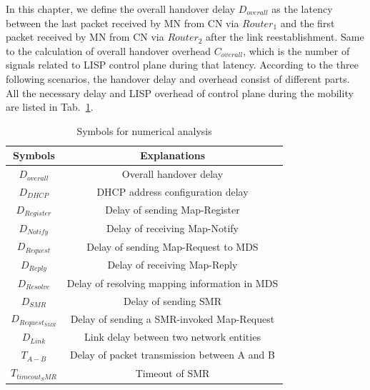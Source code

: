 In this chapter, we define the overall handover delay $D_{overall}$ as the latency between the last packet received by MN from CN via $Router_1$ and the first packet received by MN from CN via $Router_2$ after the link reestablishment. 
Same to the calculation of overall handover overhead $C_{overall}$, which is the number of signals related to LISP control plane during that latency. 
According to the three following scenarios, the handover delay and overhead consist of different parts. All the necessary delay and LISP overhead of control plane during the mobility are listed in Tab.~\ref{Symbols_numerical_analysis}.
\begin{table}[!tb]
	\centering
	\caption{Symbols for numerical analysis}
	\label{Symbols_numerical_analysis}{
		\begin{tabular}{@{}|c|c|@{}}
			\hline\hline
			Symbols & Explanations   \\ \hline
			$D_{overall}$ & Overall handover delay	\\  \hline    
			$D_{DHCP}$ &  DHCP address configuration delay \\  \hline    
			$D_{Register}$ &  Delay of sending Map-Register      	\\  \hline
			$D_{Notify}$ &  Delay of receiving Map-Notify      	\\  \hline           
			$D_{Request}$ &  Delay of sending Map-Request to MDS      	\\  \hline   
			$D_{Reply}$ &  Delay of receiving Map-Reply      	\\  \hline      
			$D_{Resolve}$ &  Delay of resolving mapping information in MDS      	\\  \hline               
			$D_{SMR}$ &  Delay of sending SMR       	\\  \hline 
			$D_{Request_{SMR}}$ &  Delay of sending a SMR-invoked Map-Request \\  \hline 
			$D_{Link}$ &  Link delay between two network entities \\  \hline 
			$T_{A-B}$ &  Delay of packet transmission between A and B     	\\  \hline
			$T_{timeout_SMR}$ &  Timeout of SMR \\  \hline  \hline    
		\end{tabular}
	}
\end{table}



